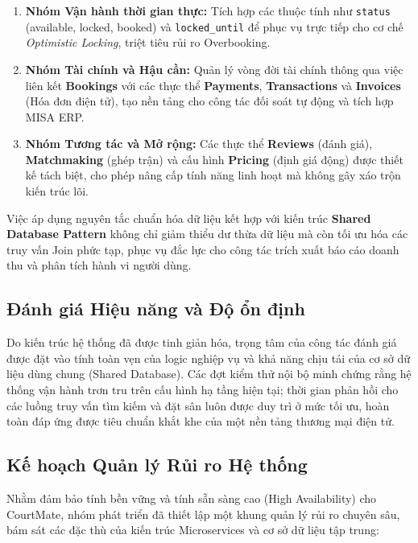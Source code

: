 \begin{enumerate}
    \item \textbf{Nhóm Vận hành thời gian thực:} Tích hợp các thuộc tính như \texttt{status} (available, locked, booked) và \texttt{locked\_until} để phục vụ trực tiếp cho cơ chế \textit{Optimistic Locking}, triệt tiêu rủi ro Overbooking.
    \item \textbf{Nhóm Tài chính và Hậu cần:} Quản lý vòng đời tài chính thông qua việc liên kết \textbf{Bookings} với các thực thể \textbf{Payments}, \textbf{Transactions} và \textbf{Invoices} (Hóa đơn điện tử), tạo nền tảng cho công tác đối soát tự động và tích hợp MISA ERP.
    \item \textbf{Nhóm Tương tác và Mở rộng:} Các thực thể \textbf{Reviews} (đánh giá), \textbf{Matchmaking} (ghép trận) và cấu hình \textbf{Pricing} (định giá động) được thiết kế tách biệt, cho phép nâng cấp tính năng linh hoạt mà không gây xáo trộn kiến trúc lõi.
\end{enumerate}

Việc áp dụng nguyên tắc chuẩn hóa dữ liệu kết hợp với kiến trúc \textbf{Shared Database Pattern} không chỉ giảm thiểu dư thừa dữ liệu mà còn tối ưu hóa các truy vấn Join phức tạp, phục vụ đắc lực cho công tác trích xuất báo cáo doanh thu và phân tích hành vi người dùng.

\subsection{Đánh giá Hiệu năng và Độ ổn định}
Do kiến trúc hệ thống đã được tinh giản hóa, trọng tâm của công tác đánh giá được đặt vào tính toàn vẹn của logic nghiệp vụ và khả năng chịu tải của cơ sở dữ liệu dùng chung (Shared Database). Các đợt kiểm thử nội bộ minh chứng rằng hệ thống vận hành trơn tru trên cấu hình hạ tầng hiện tại; thời gian phản hồi cho các luồng truy vấn tìm kiếm và đặt sân luôn được duy trì ở mức tối ưu, hoàn toàn đáp ứng được tiêu chuẩn khắt khe của một nền tảng thương mại điện tử.

\subsection{Kế hoạch Quản lý Rủi ro Hệ thống}
Nhằm đảm bảo tính bền vững và tính sẵn sàng cao (High Availability) cho CourtMate, nhóm phát triển đã thiết lập một khung quản lý rủi ro chuyên sâu, bám sát các đặc thù của kiến trúc Microservices và cơ sở dữ liệu tập trung:

